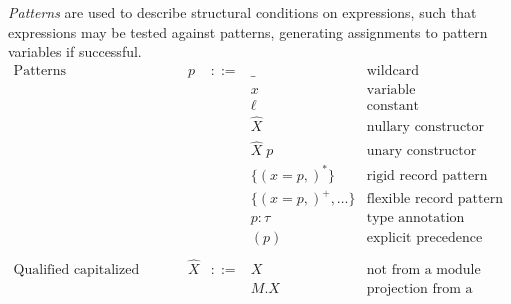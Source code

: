 \documentclass{article}
\begin{document}
\emph{Patterns} are used to describe structural conditions on expressions, such that expressions may be tested against patterns, generating assignments to pattern variables if successful.
$$\begin{array}{rrcll}
  \textrm{Patterns} & p &::=& \_ & \textrm{wildcard} \\
  &&& x & \textrm{variable} \\
  &&& \ell & \textrm{constant} \\
  &&& \hat{X} & \textrm{nullary constructor} \\
  &&& \hat{X} \; p & \textrm{unary constructor} \\
  &&& \{(x = p,)^*\} & \textrm{rigid record pattern} \\
  &&& \{(x = p,)^+, \ldots\} & \textrm{flexible record pattern} \\
  &&& p : \tau & \textrm{type annotation} \\
  &&& (p) & \textrm{explicit precedence} \\
  \\
  \textrm{Qualified capitalized variables} & \hat{X} &::=& X & \textrm{not from a module} \\
  &&& M.X & \textrm{projection from a module} \\
\end{array}$$
\end{document}
